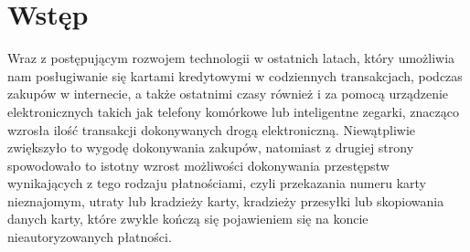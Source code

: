 \documentclass[inzynierska]{pwr_wmat_praca_dyplomowa}
\theoremstyle{plain}
\numberwithin{theorem}{chapter}
\theoremstyle{definition}
\numberwithin{theorem}{chapter}
\begin{document}
	
\newcommand{\htx}{h_{\theta}(\boldsymbol{x_i})}
\newcommand{\es}{\mathcal{S}}
\newcommand{\ef}{\mathcal{F}}
\newcommand{\iks}{\boldsymbol{x}}
\newcommand{\bes}{\boldsymbol{S}}
\newcommand{\yht}[1]{y_i^{(#1)}}
\newcommand{\ylab}[2]{\text{#1}_{\text{#2}}}

\newenvironment{talign}
{\align}
{\endalign}

\newenvironment{talign*}
{\csname align*\endcsname}
{\endalign}

\newenvironment{myitemize}
{\begin{easylist}[itemize]\ListProperties(Hang=true, Progressive=3ex, Style*=-)}
{\end{easylist}}


\frontmatter
\maketitle
\mainmatter
\tableofcontents



{\backmatter \chapter{Wstęp}}
Wraz z postępującym rozwojem technologii w ostatnich latach, który umożliwia nam posługiwanie się kartami kredytowymi w codziennych transakcjach, podczas zakupów w internecie, a także ostatnimi czasy również i za pomocą urządzenie elektronicznych takich jak telefony komórkowe lub inteligentne zegarki, znacząco wzrosła ilość transakcji dokonywanych drogą elektroniczną. Niewątpliwie zwiększyło to wygodę dokonywania zakupów, natomiast z drugiej strony spowodowało to istotny wzrost możliwości dokonywania przestępstw wynikających z tego rodzaju płatnościami, czyli przekazania numeru karty nieznajomym, utraty lub kradzieży karty, kradzieży przesyłki lub skopiowania danych karty, które zwykle kończą się pojawieniem się na koncie nieautoryzowanych płatności.
\end{document}
